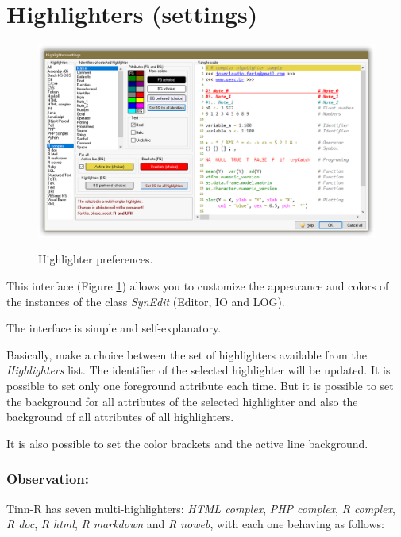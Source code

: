 
\hypertarget{working_highlighters}{}
\section{Highlighters (settings)}

\begin{figure}[H]
  \includegraphics[scale=0.50]{./res/highlighter_settings.png}\\
  \caption{Highlighter preferences.}
  \label{fig:highlighter_preferences}
\end{figure}

This interface
(Figure \ref{fig:highlighter_preferences})
allows you to customize the appearance and colors of the
instances of the class \textit{SynEdit} (Editor, IO and LOG).

The interface is simple and self-explanatory.

Basically, make a choice between the set of highlighters available
from the \textit{Highlighters} list. The identifier of the selected
highlighter will be updated. It is possible to set only one
foreground attribute each time. But it is possible to set the
background for all attributes of the selected highlighter and also
the background of all attributes of all highlighters.

It is also possible to set the color brackets and the active line
background.


\subsubsection{Observation:}

Tinn-R has seven multi-highlighters: \textit{HTML complex}, \textit{PHP complex},
\textit{R complex}, \textit{R doc},  \textit{R html}, \textit{R markdown} and \textit{R noweb},
with each one behaving as follows:

